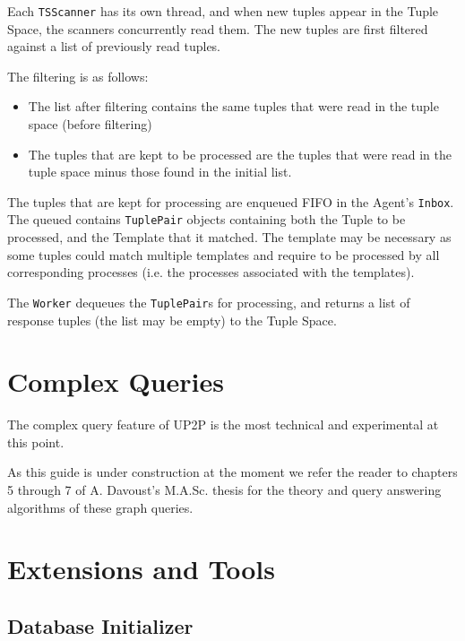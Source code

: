 \documentclass[titlepage]{article}%
\begin{document}
Each \verb.TSScanner. has its own thread, and when new tuples appear in the Tuple Space, the scanners concurrently read them.
The new tuples are first filtered against a list of previously read tuples. 

The filtering is as follows:
\begin{itemize}
\item The list after filtering contains the same tuples that were read in the tuple space (before filtering)
\item The tuples that are kept to be processed are the tuples that were read in the tuple space minus those found in the initial list.
\end{itemize}

The tuples that are kept for processing are enqueued FIFO in the Agent's \verb.Inbox.. The queued contains \verb.TuplePair. objects containing both the Tuple to be processed, and the Template that it matched. The template may be necessary as some tuples could match multiple templates and require to be processed by all corresponding processes (i.e. the processes associated with the templates).

The \verb.Worker. dequeues the \verb.TuplePair.s for processing, and returns a list of response tuples (the list may be empty) to the Tuple Space.

\section{Complex Queries}
\label{sec:ComplexQueries}

The complex query feature of UP2P is the most technical and experimental at this point.

As this guide is under construction at the moment we refer the reader to chapters 5 through 7 of A. Davoust's M.A.Sc. thesis \cite{alanMASCthesis} for the theory and query answering algorithms of these graph queries. 

\section{Extensions and Tools}
\label{sec:ExtensionsDesign}

\subsection{Database Initializer}
\end{document}
